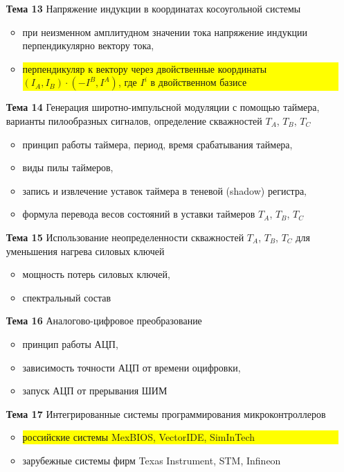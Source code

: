 \begin{itemize}
\item[\bf{Тема 13}]{Напряжение индукции в координатах косоугольной системы}
  \begin{itemize}
  \item при неизменном амплитудном значении тока напряжение индукции перпендикулярно вектору тока,
  \item \colorbox{yellow}{\parbox[t]{0.85\textwidth}{перпендикуляр к вектору через двойственные координаты \\ $(I_A, I_B)\cdot (-I^B, I^A)$, где $I^i$ в двойственном базисе}}
  \end{itemize}
\item[\bf{Тема 14}]{Генерация широтно-импульсной модуляции с помощью таймера, варианты пилообразных сигналов, определение скважностей $T_A$, $T_B$, $T_C$}
  \begin{itemize}
  \item {принцип работы таймера, период, время срабатывания таймера},
   \item виды пилы таймеров,
   \item запись и извлечение уставок таймера в теневой (shadow) регистра,
   \item {формула перевода весов состояний в уставки таймеров $T_A$, $T_B$, $T_C$}
  \end{itemize}
\item[\bf{Тема 15}]{Использование неопределенности скважностей $T_A$, $T_B$, $T_C$ для уменьшения нагрева силовых ключей}
  \begin{itemize}
   \item мощность потерь силовых ключей,
   \item спектральный состав
  \end{itemize}
\item[\bf{Тема 16}]{Аналогово-цифровое преобразование}
  \begin{itemize}
   \item принцип работы АЦП,
   \item зависимость точности АЦП от времени оцифровки,
   \item запуск АЦП от прерывания ШИМ
  \end{itemize}
\item[\bf{Тема 17}]{Интегрированные системы программирования микроконтроллеров}
   \begin{itemize}
    \item \colorbox{yellow}{\parbox[t]{0.8\textwidth}{российские системы MexBIOS, VectorIDE, SimInTech}}
    \item {зарубежные системы фирм Texas Instrument, STM, Infineon}

\end{itemize}
\end{itemize}
